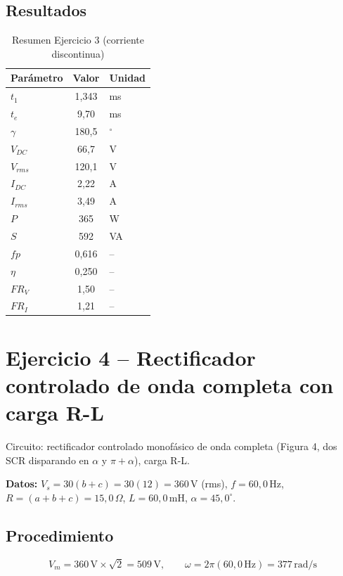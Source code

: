 \documentclass[12pt,a4paper]{article}
\begin{document}
\subsection{Resultados}

\begin{table}[H]
\centering
\begin{tabular}{lcl}
\toprule
\textbf{Parámetro} & \textbf{Valor} & \textbf{Unidad}\\
\midrule
$t_1$ & 1{,}343 & ms\\
$t_e$ & 9{,}70 & ms\\
$\gamma$ & 180{,}5 & $^\circ$\\
$V_{DC}$ & 66{,}7 & V\\
$V_{rms}$ & 120{,}1 & V\\
$I_{DC}$ & 2{,}22 & A\\
$I_{rms}$ & 3{,}49 & A\\
$P$ & 365 & W\\
$S$ & 592 & VA\\
$fp$ & 0{,}616 & --\\
$\eta$ & 0{,}250 & --\\
$FR_V$ & 1{,}50 & --\\
$FR_I$ & 1{,}21 & --\\
\bottomrule
\end{tabular}
\caption{Resumen Ejercicio 3 (corriente discontinua)}
\end{table}

\newpage
\section{Ejercicio 4 -- Rectificador controlado de onda completa con carga R-L}

Circuito: rectificador controlado monofásico de onda completa (Figura 4, dos
SCR disparando en $\alpha$ y $\pi+\alpha$), carga R-L.

\textbf{Datos:} $V_s=30(b+c)=30(12)=360\,\text{V}$ (rms), $f=60{,}0\,\text{Hz}$,
$R=(a+b+c)=15{,}0\,\Omega$, $L=60{,}0\,\text{mH}$, $\alpha=45{,}0^\circ$.

\subsection{Procedimiento}

\begin{equation}
    V_m = 360\,\text{V}\times\sqrt2 = 509\,\text{V}, \qquad
    \omega = 2\pi(60{,}0\,\text{Hz}) = 377\,\text{rad/s}
\end{equation}
\end{document}

